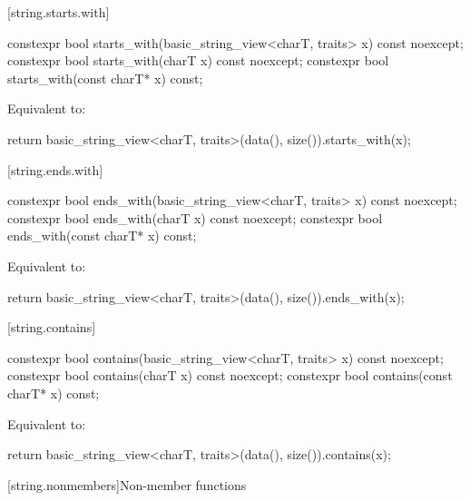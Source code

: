 [string.starts.with]{}

%
\begin{itemdecl}
constexpr bool starts_with(basic_string_view<charT, traits> x) const noexcept;
constexpr bool starts_with(charT x) const noexcept;
constexpr bool starts_with(const charT* x) const;
\end{itemdecl}

\begin{itemdescr}
\pnum
\effects
Equivalent to:
\begin{codeblock}
return basic_string_view<charT, traits>(data(), size()).starts_with(x);
\end{codeblock}
\end{itemdescr}

[string.ends.with]{}

%
\begin{itemdecl}
constexpr bool ends_with(basic_string_view<charT, traits> x) const noexcept;
constexpr bool ends_with(charT x) const noexcept;
constexpr bool ends_with(const charT* x) const;
\end{itemdecl}

\begin{itemdescr}
\pnum
\effects
Equivalent to:
\begin{codeblock}
return basic_string_view<charT, traits>(data(), size()).ends_with(x);
\end{codeblock}
\end{itemdescr}

[string.contains]{}

%
\begin{itemdecl}
constexpr bool contains(basic_string_view<charT, traits> x) const noexcept;
constexpr bool contains(charT x) const noexcept;
constexpr bool contains(const charT* x) const;
\end{itemdecl}

\begin{itemdescr}
\pnum
\effects
Equivalent to:
\begin{codeblock}
return basic_string_view<charT, traits>(data(), size()).contains(x);
\end{codeblock}
\end{itemdescr}

[string.nonmembers]{Non-member functions}

